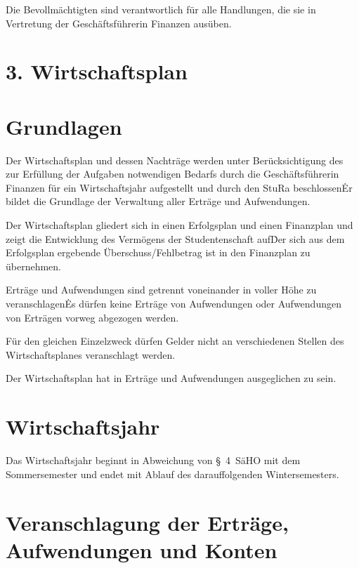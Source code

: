 {\begin{multicols}{2}
\Abs \Satz Die Bevollmächtigten sind verantwortlich für alle Handlungen, die sie in Vertretung der Geschäftsführerin Finanzen ausüben.


\section*{3. Wirtschaftsplan}



\section{Grundlagen}

\Abs \Satz Der Wirtschaftsplan und dessen Nachträge werden unter Berücksichtigung des zur Erfüllung der Aufgaben notwendigen Bedarfs durch die Geschäftsführerin Finanzen für ein Wirtschaftsjahr aufgestellt und durch den StuRa beschlossen\. Er bildet die Grundlage der Verwaltung aller Erträge und Aufwendungen.

\Abs \Satz Der Wirtschaftsplan gliedert sich in einen Erfolgsplan und einen Finanzplan und zeigt die Entwicklung des Vermögens der Studentenschaft auf\. Der sich aus dem Erfolgsplan ergebende Überschuss/Fehlbetrag ist in den Finanzplan zu übernehmen.

\Abs \Satz Erträge und Aufwendungen sind getrennt voneinander in voller Höhe zu veranschlagen\. Es dürfen keine Erträge von Aufwendungen oder Aufwendungen von Erträgen vorweg abgezogen werden.

\Abs \Satz Für den gleichen Einzelzweck dürfen Gelder nicht an verschiedenen Stellen des Wirtschaftsplanes veranschlagt werden.

\Abs \Satz Der Wirtschaftsplan hat in Erträge und Aufwendungen ausgeglichen zu sein.



\section{Wirtschaftsjahr}

\Abs \Satz Das Wirtschaftsjahr beginnt in Abweichung von §~4~SäHO mit dem Sommersemester und endet mit Ablauf des darauffolgenden Wintersemesters.



\section{Veranschlagung der Erträge, Aufwendungen und Konten}


\end{multicols}}
